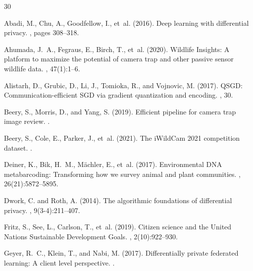 \begin{thebibliography}{30}

Abadi, M., Chu, A., Goodfellow, I., et~al. (2016).
\newblock Deep learning with differential privacy.
, pages 308--318.

Ahumada, J.~A., Fegraus, E., Birch, T., et~al. (2020).
\newblock Wildlife Insights: A platform to maximize the potential of camera trap and other passive sensor wildlife data.
, 47(1):1--6.

Alistarh, D., Grubic, D., Li, J., Tomioka, R., and Vojnovic, M. (2017).
\newblock QSGD: Communication-efficient SGD via gradient quantization and encoding.
, 30.

Beery, S., Morris, D., and Yang, S. (2019).
\newblock Efficient pipeline for camera trap image review.
.

Beery, S., Cole, E., Parker, J., et~al. (2021).
\newblock The iWildCam 2021 competition dataset.
.

Deiner, K., Bik, H.~M., M\"{a}chler, E., et~al. (2017).
\newblock Environmental DNA metabarcoding: Transforming how we survey animal and plant communities.
, 26(21):5872--5895.

Dwork, C. and Roth, A. (2014).
\newblock The algorithmic foundations of differential privacy.
, 9(3-4):211--407.

Fritz, S., See, L., Carlson, T., et~al. (2019).
\newblock Citizen science and the United Nations Sustainable Development Goals.
, 2(10):922--930.

Geyer, R.~C., Klein, T., and Nabi, M. (2017).
\newblock Differentially private federated learning: A client level perspective.
.


\end{thebibliography}
